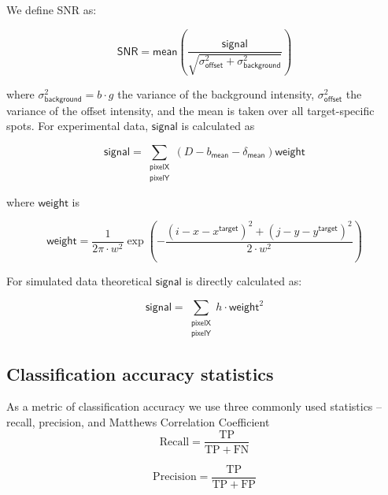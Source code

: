 We define SNR as:

\begin{equation}
    \mathsf{SNR} = \mathsf{mean} \left( \dfrac{\mathsf{signal}}{\sqrt{\sigma^2_{\mathsf{offset}} + \sigma^2_{\mathsf{background}}}} \right)
\end{equation}

where $\sigma^2_{\mathsf{background}} = b \cdot g$ the variance of the background intensity, $\sigma^2_{\mathsf{offset}}$ the variance of the offset intensity, and the mean is taken over all target-specific spots.  For experimental data, $\mathsf{signal}$ is calculated as

\begin{equation}
    \mathsf{signal} =  \sum_{\substack{\mathsf{pixelX} \\ \mathsf{pixelY}}} \left( D - b_{\mathsf{mean}} - \delta_\mathsf{mean} \right)  \mathsf{weight}
\end{equation}

where $\mathsf{weight}$ is

\begin{equation}
    \mathsf{weight} = \dfrac{1}{2 \pi \cdot w^2} \exp{\left( -\dfrac{(i-x-x^\mathsf{target})^2 + (j-y-y^\mathsf{target})^2}{2 \cdot w^2} \right)}
\end{equation}

For simulated data theoretical $\mathsf{signal}$ is directly calculated as:

\begin{equation}
    \mathsf{signal} =  \sum_{\substack{\mathsf{pixelX} \\ \mathsf{pixelY}}} h \cdot \mathsf{weight}^2
\end{equation}

\subsection{Classification accuracy statistics}

As a metric of classification accuracy we use three commonly used statistics -- recall, precision, and Matthews Correlation Coefficient \citep{Matthews1975-rw}
\begin{equation}
    \mathrm{Recall} = \dfrac{\mathrm{TP}}{\mathrm{TP} + \mathrm{FN}}
\end{equation}

\begin{equation}
    \mathrm{Precision} = \dfrac{\mathrm{TP}}{\mathrm{TP} + \mathrm{FP}}
\end{equation}

